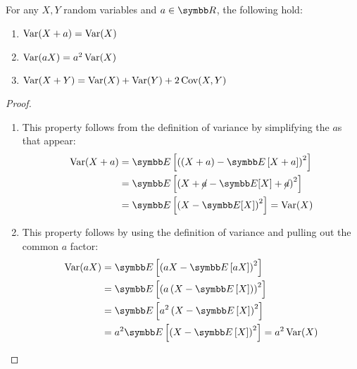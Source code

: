 \begin{proposition}
For any \(X, Y\) random variables and \(a \in \reals\), the following hold:
\begin{enumerate}
    \item \(\operatorname{Var}(X + a) = \operatorname{Var}(X)\)
    \item \(\operatorname{Var}(a X) = a^2 \operatorname{Var}(X)\)
    \item \(\operatorname{Var}(X + Y) = \operatorname{Var}(X) + \operatorname{Var}(Y) + 2 \operatorname{Cov}(X, Y)\)
\end{enumerate}
\end{proposition}
\begin{proof}
~
\begin{enumerate}
    \item This property follows from the definition of variance by simplifying the \(a\)s that appear:
    \begin{align*}
        \variance(X + a) &= \expectedvalue\left[\left(\left(X + a\right) - \expectedvalue\left[X + a\right]\right)^2\right] \\
        &= \expectedvalue\left[\left(X + \cancel{a} - \expectedvalue[X] + \cancel{a}\right)^2\right] \\
        &= \expectedvalue\left[\left(X - \expectedvalue[X]\right)^2\right] = \variance(X)
    \end{align*}

    \item This property follows by using the definition of variance and pulling out the common \(a\) factor:
    \begin{align*}
        \variance(a X) &= \expectedvalue\left[\left(a X - \expectedvalue\left[a X\right]\right)^2\right] \\
        &= \expectedvalue\left[\left(a \left(X - \expectedvalue\left[X\right]\right)\right)^2\right] \\
        &= \expectedvalue\left[a^2 \left(X - \expectedvalue\left[X\right]\right)^2\right] \\
        &= a^2 \expectedvalue\left[\left(X - \expectedvalue\left[X\right]\right)^2\right] = a^2 \variance(X)
    \end{align*}


\end{enumerate}
\end{proof}
